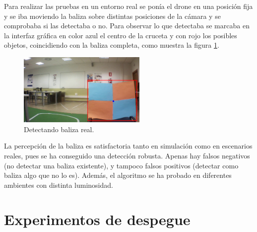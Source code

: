 \hspace{1cm} Para realizar las pruebas en un entorno real se pon\'ia el drone en una posici\'on fija y se iba moviendo la baliza sobre distintas posiciones de la c\'amara y se comprobaba si las detectaba o no. Para observar lo que detectaba se marcaba en la interfaz gr\'afica en color azul el centro de la cruceta y con rojo los posibles objetos, coincidiendo con la baliza completa, como muestra la figura \ref{fig:Detectando_baliza_real}.

\begin{figure}[H]
	\centering
		\includegraphics[width=0.55\textwidth]{imgs/k_beacon21.jpg}
		\caption{Detectando baliza real.}
	\label{fig:Detectando_baliza_real}
\end{figure}


\hspace{1cm} La percepci\'on de la baliza es satisfactoria tanto en simulaci\'on como en escenarios reales, pues se ha conseguido una detecci\'on robusta. Apenas hay falsos negativos (no detectar una baliza existente), y tampoco falsos positivos (detectar como baliza algo que no lo es). Adem\'as, el algoritmo se ha probado en diferentes ambientes con distinta luminosidad.


\section{Experimentos de despegue}


